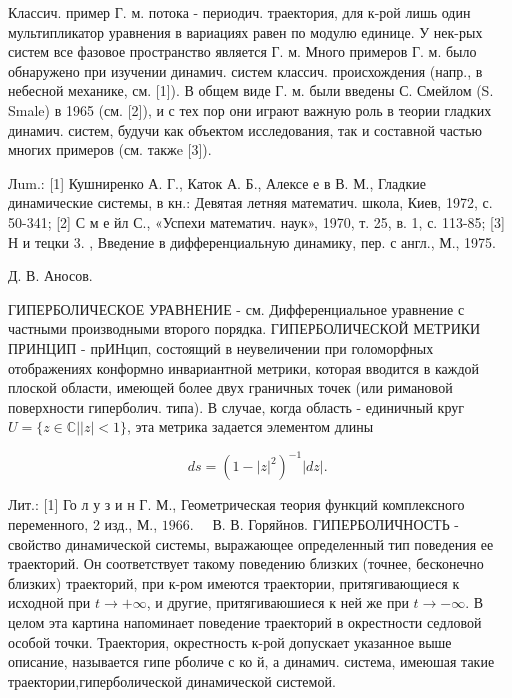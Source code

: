 \documentclass[10pt]{article}
\begin{document}
Классич. пример Г. м. потока - периодич. траектория, для к-рой лишь один мультипликатор уравнения в вариациях равен по модулю единице. У нек-рых систем все фазовое пространство является Г. м. Много примеров Г. м. было обнаружено при изучении динамич. систем классич. происхождения (напр., в небесной механике, см. [1]). В общем виде Г. м. были введены С. Смейлом (S. Smale) в 1965 (см. [2]), и с тех пор они играют важную роль в теории гладких динамич. систем, будучи как объектом исследования, так и составной частью многих примеров (см. такжe [3]).



Лum.: [1] Кушниренко А. Г., Каток А. Б., Алексе е в В. М., Гладкие динамические системы, в кн.: Девятая летняя математич. школа, Киев, 1972, с. 50-341; [2] С м е йл С., «Успехи математич. наук», 1970, т. 25, в. 1, с. 113-85; [3] Н и тецки 3. , Введение в дифференциальную динамику, пер. с англ., М., 1975.



Д. В. Аносов.



ГИПЕРБОЛИЧЕСКОЕ УРАВНЕНИЕ - см. Дифференциальное уравнение с частными производными второго порядка. ГИПЕРБОЛИЧЕСКОЙ МЕТРИКИ ПРИНЦИП - прИНцип, состоящий в неувеличении при голоморфных отображениях конформно инвариантной метрики, которая вводится в каждой плоской области, имеющей более двух граничных точек (или римановой поверхности гиперболич. типа). В случае, когда область - единичный круг $U=\{z \in \mathbb{C}|| z \mid<1\}$, эта метрика задается элементом длины



\[

d s=\left(1-|z|^{2}\right)^{-1}|d z| \text {. }

\]



Лит.: [1] Го л у з и н Г. М., Геометрическая теория функций комплексного переменного, 2 изд., М., $1966 . \quad$ В. В. Горяйнов. ГИПЕРБОЛИЧНОСТЬ - свойство динамической системы, выражающее определенный тип поведения ее траекторий. Он соответствует такому поведению близких (точнее, бесконечно близких) траекторий, при к-ром имеются траектории, притягивающиеся к исходной при $t \rightarrow+\infty$, и другие, притягиваюшиеся к ней же при $t \rightarrow-\infty$. В целом эта картина напоминает поведение траекторий в окрестности седловой особой точки. Траектория, окрестность к-рой допускает указанное выше описание, называется гипе рболиче с ко й, а динамич. система, имеюшая такие траектории,гиперболической динамической системой.
\end{document}
